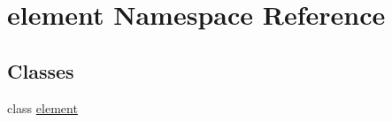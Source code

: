\hypertarget{namespaceelement}{}\section{element Namespace Reference}
\label{namespaceelement}
\subsection*{Classes}
\begin{DoxyCompactItemize}
\item 
class \hyperlink{classelement_1_1element}{element}
\end{DoxyCompactItemize}

